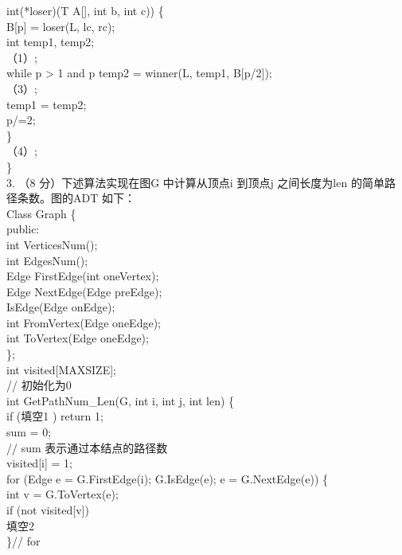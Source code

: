 \begin{question}
int(*loser)(T A[], int b, int c)) \{\\
B[p] = loser(L, lc, rc);\\
int temp1, temp2;\\
（1）\underline{\hspace{12em}};\\
while p > 1 and p %
temp2 = winner(L, temp1, B[p/2]);\\
（3）\underline{\hspace{12em}};\\
temp1 = temp2;\\
p/=2;\\
\}\\
（4）\underline{\hspace{12em}};\\
\}\\
3. （8 分）下述算法实现在图G 中计算从顶点i 到顶点j 之间长度为len 的简单路\\
径条数。图的ADT 如下：\\
Class Graph \{\\
public:\\
int VerticesNum();\\
int EdgesNum();\\
Edge FirstEdge(int oneVertex);\\
Edge NextEdge(Edge preEdge);\\
IsEdge(Edge onEdge);\\
int FromVertex(Edge oneEdge);\\
int ToVertex(Edge oneEdge);\\
\};\\
int visited[MAXSIZE];\\
// 初始化为0\\
int GetPathNum\_Len(G, int i, int j, int len)  \{\\
if (填空1 \underline{\hspace{12em}}) return 1;\\
sum = 0;\\
// sum 表示通过本结点的路径数\\
visited[i] = 1;\\
for (Edge e = G.FirstEdge(i); G.IsEdge(e); e = G.NextEdge(e)) \{\\
int v = G.ToVertex(e);\\
if (not visited[v])\\
填空2 \underline{\hspace{12em}}\\
\}// for\\

\end{question}
